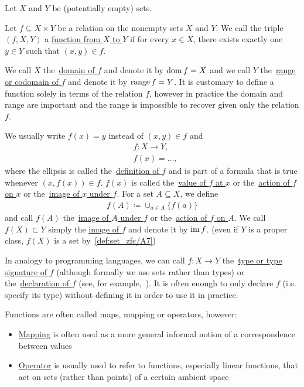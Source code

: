 \begin{definition}[Functions]\label{def:function}
  Let $X$ and $Y$ be (potentially empty) sets.

  Let $f \subseteq X \times Y$ be a relation on the nonempty sets $X$ and $Y$. We call the triple $(f, X, Y)$ a \uline{function from $X$ to $Y$} if for every $x \in X$, there exists exactly one $y \in Y$ such that $(x, y) \in f$.

  We call $X$ the~\uline{domain of $f$} and denote it by $\operatorname{dom} f = X$ and we call $Y$ the~\uline{range or codomain of $f$} and denote it by $\operatorname{range} f = Y$. It is customary to define a function solely in terms of the relation $f$, however in practice the domain and range are important and the range is impossible to recover given only the relation $f$.

  We usually write $f(x) = y$ instead of $(x, y) \in f$ and
  \begin{align*}
    &f: X \to Y, \\
    &f(x) = \ldots,
  \end{align*}
  where the ellipsis is called the~\uline{definition of $f$} and is part of a formula that is true whenever $(x, f(x)) \in f$. $f(x)$ is called the~\uline{value of $f$ at $x$} or the~\uline{action of $f$ on $x$} or the~\uline{image of $x$ under $f$}. For a set $A \subseteq X$, we define
  \begin{align*}
    f(A) \coloneqq \cup_{a \in A} \{ f(a) \}
  \end{align*}
  and call $f(A)$ the~\uline{image of $A$ under $f$} or the~\uline{action of $f$ on $A$}. We call $f(X) \subset Y$ simply the \uline{image of $f$} and denote it by $\operatorname{im} f$. (even if $Y$ is a proper class, $f(X)$ is a set by~\cref{def:set_zfc/A7})

  In analogy to programming languages, we can call $f: X \to Y$ the~\uline{type or type signature of $f$} (although formally we use sets rather than types) or the~\uline{declaration of $f$} (see, for example,~\cite[section 2.4]{Kernighan1988}). It is often enough to only declare $f$ (i.e. specify its type) without defining it in order to use it in practice.

  Functions are often called maps, mapping or operators, however:
  \begin{itemize}
    \item \uline{Mapping} is often used as a more general informal notion of a correspondence between values
    \item \uline{Operator} is usually used to refer to functions, especially linear functions, that act on sets (rather than points) of a certain ambient space
  \end{itemize}


\end{definition}
